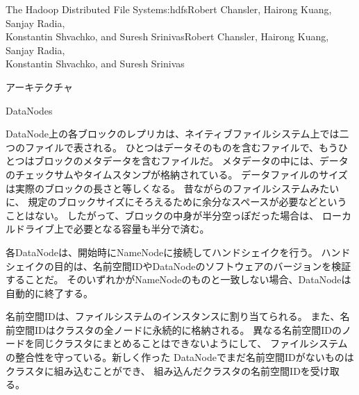 \begin{aosachaptertoc}{The Hadoop Distributed File System}{s:hdfs}{Robert Chansler, Hairong Kuang, Sanjay Radia, \\ Konstantin Shvachko, and Suresh Srinivas}{Robert Chansler, Hairong Kuang, Sanjay Radia, \\ \hspace*{0.9cm} Konstantin Shvachko, and Suresh Srinivas}
\begin{aosasect1}{アーキテクチャ}
\begin{aosasect2}{DataNodes}

DataNode上の各ブロックのレプリカは、ネイティブファイルシステム上では二つのファイルで表される。
ひとつはデータそのものを含むファイルで、もうひとつはブロックのメタデータを含むファイルだ。
メタデータの中には、データのチェックサムやタイムスタンプが格納されている。
データファイルのサイズは実際のブロックの長さと等しくなる。
昔ながらのファイルシステムみたいに、
規定のブロックサイズにそろえるために余分なスペースが必要などということはない。
したがって、ブロックの中身が半分空っぽだった場合は、
ローカルドライブ上で必要となる容量も半分で済む。

各DataNodeは、開始時にNameNodeに接続してハンドシェイクを行う。
ハンドシェイクの目的は、名前空間IDやDataNodeのソフトウェアのバージョンを検証することだ。
そのいずれかがNameNodeのものと一致しない場合、DataNodeは自動的に終了する。

名前空間IDは、ファイルシステムのインスタンスに割り当てられる。
また、名前空間IDはクラスタの全ノードに永続的に格納される。
異なる名前空間IDのノードを同じクラスタにまとめることはできないようにして、
ファイルシステムの整合性を守っている。新しく作った
DataNodeでまだ名前空間IDがないものはクラスタに組み込むことができ、
組み込んだクラスタの名前空間IDを受け取る。


\end{aosasect2}
\end{aosasect1}
\end{aosachaptertoc}
